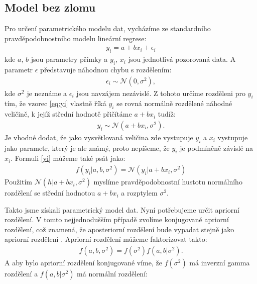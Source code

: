 \documentclass[czech,master,public,dept470,male,cpdeclaration,oneside, python]{diploma}
\begin{document}
\subsection{Model bez zlomu}
Pro určení parametrického modelu dat, vycházíme ze standardního pravděpodobnostního modelu lineární regrese: 
\begin{align}
	\label{eq:yi}
	y_i = a + b x_i + \epsilon_i
\end{align}
kde $a$, $b$ jsou parametry přímky a $y_i$, $x_i$ jsou jednotlivá pozorovaná data. A parametr $\epsilon$ představuje náhodnou chybu s rozdělením:
\begin{align*}
	\epsilon_i \sim \mathcal{N}(0, \sigma^2),
\end{align*}
kde $\sigma^2$ je neznáme a $\epsilon_i$ jsou navzájem nezávislé.
Z tohoto určíme rozděleni pro $y_i$ tím, že vzorec \eqref{eq:yi} vlastně říká $y_i$ se rovná normálně rozdělené náhodné veličině, k jejíž střední hodnotě přičítáme $a + bx_i$ tudíž:
\begin{align}\label{yi}
	y_i \sim \mathcal{N}(a + bx_i, \sigma^2).
\end{align}
Je vhodné dodat, že jako vysvětlovaná veličina zde vystupuje $y_i$ a $x_i$ vystupuje jako parametr, který je ale známý, proto nepíšeme, že $y_i$ je podmíněně závislé na $x_i$. Formuli \ref{yi} můžeme také psát jako:
\begin{align}
	f(y_i | a, b, \sigma^2) = \mathcal{N}(y_i | a + bx_i, \sigma^2)
\end{align}
Použitím $\mathcal{N}(h | a + bx_i, \sigma^2)$ myslíme pravděpodobnostní hustotu normálního rozdělení se střední hodnotou $a + bx_i$ a rozptylem $\sigma^2$. \par
Takto jsme získali parametrický model dat. Nyní potřebujeme určit apriorní rozdělení.
V tomto nejjednodušším případě zvolíme konjugované apriorní rozdělení, což znamená, že aposteriorní rozdělení bude vypadat stejně jako apriorní rozdělení \cite{robert2007bayesian}. Apriorní rozdělení můžeme faktorizovat takto:
\begin{align}
	f(a, b, \sigma^2) = f(\sigma^2)f(a,b | \sigma^2).
\end{align}
A aby bylo apriorní rozdělení konjugované víme, že $f(\sigma^2)$ má inverzní gamma rozdělení a $f(a,b | \sigma^2)$ má normální rozdělení:
\end{document}
